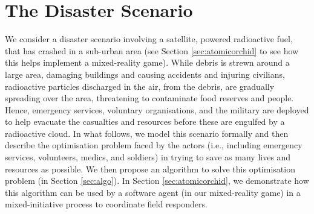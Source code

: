 \section{The Disaster Scenario}\label{sec:scenario}
\noindent We consider a disaster scenario involving a satellite, powered radioactive fuel, that has crashed in a sub-urban area (see Section \ref{sec:atomicorchid} to see how this helps implement a  mixed-reality game). While debris is strewn around a large area, damaging buildings and causing accidents and injuring civilians, radioactive particles discharged in the air, from the debris, are gradually spreading over the area, threatening to contaminate food reserves and people. Hence, emergency services, voluntary organisations, and the military are deployed to help evacuate the casualties and resources before these are engulfed by a radioactive cloud.  In what follows, we model this scenario formally and then describe the optimisation problem faced by the actors  (i.e., including emergency services, volunteers, medics, and soldiers) in trying to save as many lives and resources as possible.  We then propose an algorithm to solve this optimisation problem (in Section \ref{sec:algo}). In Section \ref{sec:atomicorchid}, we demonstrate how this algorithm can be used by a software agent (in our mixed-reality game) in a mixed-initiative process to coordinate field responders. 

